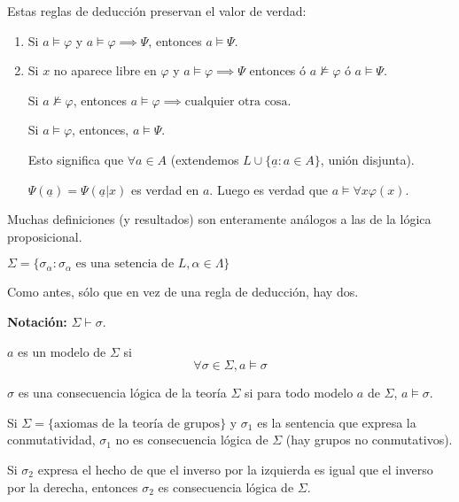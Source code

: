\begin{obs}
	Estas reglas de deducción preservan el valor de verdad:
	\begin{enumerate}
		\item Si $a\vDash \varphi$ y $a\vDash \varphi\implies\Psi$, entonces $a\vDash \Psi$.
		\item Si $x$ no aparece libre en $\varphi$ y $a\vDash \varphi \implies \Psi$ entonces ó $a\nvDash \varphi$ ó $a\vDash \Psi$.

		Si $a\nvDash \varphi$, entonces $a\vDash \varphi \implies \text{cualquier otra cosa}$.

		Si $a\vDash \varphi$, entonces, $a\vDash \Psi$.

		Esto significa que $\forall a\in A$ (extendemos $L\cup\{\underline{a}:a\in A \}$, unión disjunta).

		$\Psi (\underline{a}) = \Psi (\underline{a}|x)$ es verdad en $a$. Luego es verdad que $a\vDash \forall x\varphi(x)$.
	\end{enumerate}
\end{obs}

Muchas definiciones (y resultados) son enteramente análogos a las de la lógica proposicional.

\begin{defn}[Teoría]
	$\Sigma = \{\sigma_\alpha : \sigma_\alpha \text{ es una setencia de } L, \alpha \in \Lambda\}$
\end{defn}

\begin{defn}[Prueba]
	Como antes, sólo que en vez de una regla de deducción, hay dos.

	\textbf{Notación: } $\Sigma \vdash \sigma$.
\end{defn}

\begin{defn}[Modelo]
	$a$ es un modelo de $\Sigma$ si
	$$\forall \sigma \in \Sigma, a\vDash \sigma$$
\end{defn}

\begin{defn}
	$\sigma$ es una consecuencia lógica de la teoría $\Sigma$ si para todo modelo $a$ de $\Sigma$, $a\vDash \sigma$.
\end{defn}

\begin{example}
	Si $\Sigma =\{\text{axiomas de la teoría de grupos}\}$ y $\sigma_1$ es la sentencia que expresa la conmutatividad, $\sigma_1$ no es consecuencia lógica de $\Sigma$ (hay grupos no conmutativos).

	Si $\sigma_2$ expresa el hecho de que el inverso por la izquierda es igual que el inverso por la derecha, entonces $\sigma_2$ es consecuencia lógica de $\Sigma$.
\end{example}

